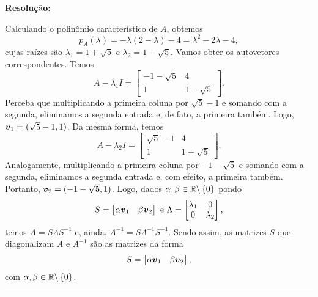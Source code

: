 \documentclass[leqno]{article}
\numberwithin{equation}{section}
\newenvironment{sol} 
{
    \vspace{4mm}
    \noindent\textbf{Resolução:}
    \strut\newline
    \smallskip
    \hspace{-3.5mm} 
} 
{\noindent\rule{4cm}{.1mm}}
\begin{document}
\begin{enumerate}
\begin{sol}
    Calculando o polinômio característico de \( A \), obtemos
    \begin{equation*}
        p_{ A } ( \lambda ) = - \lambda ( 2 - \lambda ) - 4 = \lambda^2 - 2 \lambda - 4
    ,\end{equation*}
    cujas raízes são \( \lambda_{ 1 } = 1 + \sqrt{ 5 } \) e \( \lambda_{ 2 } = 1 - \sqrt{ 5 } \).
    Vamos obter os autovetores correspondentes.
    Temos
    \begin{equation*}
        A - \lambda_{ 1 } I =
        \begin{bmatrix}
            - 1 - \sqrt{ 5 } & 4 \\
            1 & 1 - \sqrt{ 5 }
        \end{bmatrix}
    .\end{equation*}
    Perceba que multiplicando a primeira coluna por \( \sqrt{ 5 } - 1 \) e somando com a segunda, eliminamos a segunda entrada e, de fato, a primeira também.
    Logo, \( \boldsymbol{v}_{ 1 } = ( \sqrt{ 5 } - 1, 1 ) \).
    Da mesma forma, temos
    \begin{equation*}
        A - \lambda_{ 2 } I =
        \begin{bmatrix}
            \sqrt{ 5 } - 1 & 4 \\
            1 & 1 + \sqrt{ 5 }
        \end{bmatrix}
    .\end{equation*}
    Analogamente, multiplicando a primeira coluna por \( - 1 - \sqrt{ 5 } \) e somando com a segunda, eliminamos a segunda entrada e, com efeito, a primeira também.
    Portanto, \( \boldsymbol{v}_{ 2 } = ( - 1 - \sqrt{ 5 }, 1 ) \).
    Logo, dados \( \alpha, \beta \in \mathbb{R} \backslash \left\{ 0 \right\} \) pondo
    \begin{equation*}
        S =
        \begin{bmatrix}
            \alpha \boldsymbol{v}_{ 1 } & \beta \boldsymbol{v}_{ 2 }
        \end{bmatrix}
        \text{ e }
        \Lambda =
        \begin{bmatrix}
            \lambda_{ 1 } & 0 \\
            0 & \lambda_{ 2 }
        \end{bmatrix}
    ,\end{equation*}
    temos \( A = S \Lambda S^{ -1 } \) e, ainda, \( A^{ -1 } = S \Lambda^{ -1 } S^{ -1 } \).
    Sendo assim, as matrizes \( S \) que diagonalizam \( A \) e \( A^{ -1 } \) são as matrizes da forma
    \begin{equation*}
        S = 
        \begin{bmatrix}
            \alpha \boldsymbol{v}_{ 1 } & \beta \boldsymbol{v}_{ 2 }
        \end{bmatrix}
    ,\end{equation*}
    com \( \alpha, \beta \in \mathbb{R} \backslash \left\{ 0 \right\} \).


\end{sol}
\end{enumerate}
\end{document}
